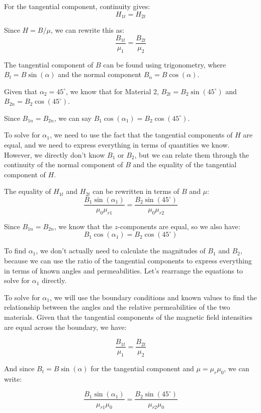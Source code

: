 \documentclass[a4paper,11pt]{article}
\begin{document}
For the tangential component, continuity gives:
\[H_{1t} = H_{2t}\]

Since \(H = B/\mu\), we can rewrite this as:
\[\frac{B_{1t}}{\mu_{1}} = \frac{B_{2t}}{\mu_{2}}\]

The tangential component of \(B\) can be found using trigonometry, where \(B_{t} = B \sin(\alpha)\) and the normal component \(B_{n} = B \cos(\alpha)\).

Given that \(\alpha_{2} = 45^\circ\), we know that for Material 2, \(B_{2t} = B_{2} \sin(45^\circ)\) and \(B_{2n} = B_{2} \cos(45^\circ)\).

Since \(B_{1n} = B_{2n}\), we can say \(B_{1} \cos(\alpha_{1}) = B_{2} \cos(45^\circ)\).

To solve for \(\alpha_{1}\), we need to use the fact that the tangential components of \(H\) are equal, and we need to express everything in terms of quantities we know. However, we directly don't know \(B_1\) or \(B_2\), but we can relate them through the continuity of the normal component of \(B\) and the equality of the tangential component of \(H\).

The equality of \(H_{1t}\) and \(H_{2t}\) can be rewritten in terms of \(B\) and \(\mu\):
\[\frac{B_{1} \sin(\alpha_{1})}{\mu_{0}\mu_{r1}} = \frac{B_{2} \sin(45^\circ)}{\mu_{0}\mu_{r2}}\]

Since \(B_{1n} = B_{2n}\), we know that the \(z\)-components are equal, so we also have:
\[B_{1} \cos(\alpha_{1}) = B_{2} \cos(45^\circ)\]

To find \(\alpha_{1}\), we don't actually need to calculate the magnitudes of \(B_1\) and \(B_2\), because we can use the ratio of the tangential components to express everything in terms of known angles and permeabilities. Let's rearrange the equations to solve for \(\alpha_{1}\) directly.

To solve for \(\alpha_{1}\), we will use the boundary conditions and known values to find the relationship between the angles and the relative permeabilities of the two materials. Given that the tangential components of the magnetic field intensities are equal across the boundary, we have:

\[
\frac{B_{1t}}{\mu_{1}} = \frac{B_{2t}}{\mu_{2}}
\]

And since \(B_t = B \sin(\alpha)\) for the tangential component and \(\mu = \mu_r \mu_0\), we can write:

\[
\frac{B_{1} \sin(\alpha_{1})}{\mu_{r1} \mu_0} = \frac{B_{2} \sin(45^\circ)}{\mu_{r2} \mu_0}
\]
\end{document}
